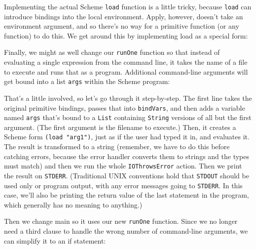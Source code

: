  
Implementing the actual Scheme \verb|load| function is a little tricky, because \verb|load| can introduce bindings into the local environment. Apply, however, doesn't take an environment argument, and so there's no way for a primitive function (or any function) to do this. We get around this by implementing load as a special form:
 
 
Finally, we might as well change our \verb|runOne| function so that instead of evaluating a single expression from the command line, it takes the name of a file to execute and runs that as a program. Additional command-line arguments will get bound into a list \lstinline|args| within the Scheme program:
 
 
That's a little involved, so let's go through it step-by-step. The first line takes the original primitive bindings, passes that into \verb|bindVars|, and then adds a variable named \lstinline|args| that's bound to a \verb|List| containing \verb|String| versions of all but the first argument. (The first argument is the filename to execute.) Then, it creates a Scheme form \lstinline|(load "arg1")|, just as if the user had typed it in, and evaluates it. The result is transformed to a string (remember, we have to do this before catching errors, because the error handler converts them to strings and the types must match) and then we run the whole \verb|IOThrowsError| action. Then we print the result on \verb|STDERR|. (Traditional UNIX conventions hold that \verb|STDOUT| should be used only or program output, with any error messages going to \verb|STDERR|. In this case, we'll also be printing the return value of the last statement in the program, which generally has no meaning to anything.)
 
Then we change main so it uses our new \verb|runOne| function. Since we no longer need a third clause to handle the wrong number of command-line arguments, we can simplify it to an if statement:
 
